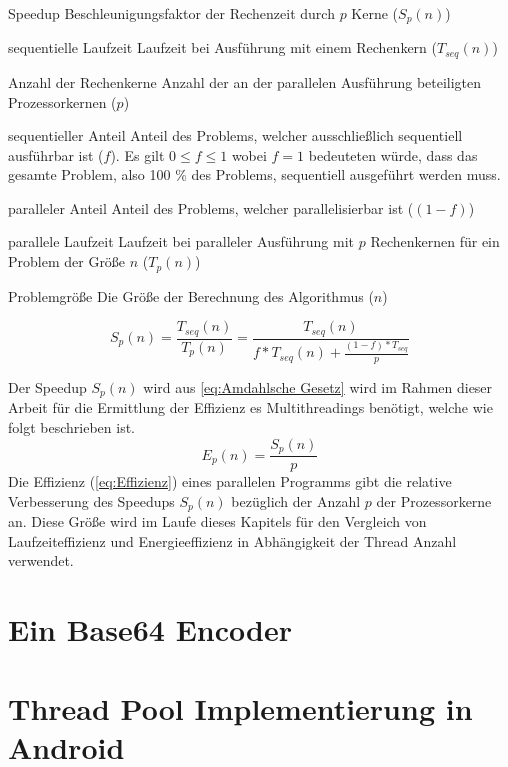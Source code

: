 \begin{aligneddescription}
\item[Speedup] Beschleunigungsfaktor der Rechenzeit durch $p$ Kerne ($S_{p}(n)$)
\item [sequentielle Laufzeit] Laufzeit bei Ausführung mit einem Rechenkern ($T_{seq}(n)$)
\item[Anzahl der Rechenkerne] Anzahl der an der parallelen Ausführung beteiligten Prozessorkernen ($p$)
\item[sequentieller Anteil] Anteil des Problems, welcher ausschließlich sequentiell ausführbar ist ($f$). Es gilt $0\leq f \leq 1$ wobei $f = 1$ bedeuteten würde, dass das gesamte Problem, also 100 \% des Problems, sequentiell ausgeführt werden muss.
\item[paralleler Anteil] Anteil des Problems, welcher parallelisierbar ist ($(1-f)$)
\item[parallele Laufzeit] Laufzeit bei paralleler Ausführung mit $p$ Rechenkernen für ein Problem der Größe $n$ ($T_{p}(n)$)
\item[Problemgröße] Die Größe der Berechnung des Algorithmus ($n$)
\end{aligneddescription}
\begin{equation}\label{eq:Amdahlsche Gesetz}
S_{p}(n)=\frac{T_{seq}(n)}{T_{p}(n)} =
\frac{T_{seq}(n)}{f*T_{seq}(n) + \frac{ (1-f)*T_{seq} }{p}}
\end{equation}
\cite[317]{parallelBook}

Der Speedup $S_{ p }(n)$ wird aus \autoref{eq:Amdahlsche Gesetz} wird im Rahmen dieser Arbeit für die Ermittlung der Effizienz es Multithreadings benötigt, welche wie folgt beschrieben ist. 
\begin{equation}\label{eq:Effizienz}
E_{ p }(n) =\frac{ S_{ p }(n) }{p}
\end{equation}
\cite[316]{parallelBook}
Die Effizienz (\autoref{eq:Effizienz}) eines parallelen Programms gibt die relative Verbesserung des Speedups $S_{ p }(n)$ bezüglich der Anzahl $p$ der Prozessorkerne an. Diese Größe wird im Laufe dieses Kapitels für den Vergleich von Laufzeiteffizienz und Energieeffizienz in Abhängigkeit der Thread Anzahl verwendet.





\section{Ein Base64 Encoder}
\section{Thread Pool Implementierung in Android}

